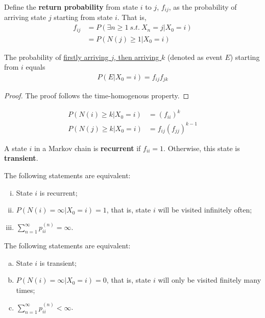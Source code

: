 \documentclass{article}
\begin{document}
    \begin{definition}
    	Define the \textbf{return probability} from state $i$ to $j$, $f_{ij}$, as the probability of arriving state $j$ starting from state $i$. That is,
    	\begin{align}
    		f_{ij} &= P(\exists n \geq 1\ s.t.\ X_n = j | X_0 = i) \\
    		&= P(N(j) \geq 1 | X_0 = i)
    	\end{align}
    \end{definition}
    
    \begin{proposition}
    	The probability of \ul{firstly arriving $j$, then arriving $k$} (denoted as event $E$) starting from $i$ equals
    	\begin{align}
    		P(E|X_0=i) = f_{ij} f_{jk}
    	\end{align}
    \end{proposition}
    
    \begin{proof}
    	The proof follows the time-homogenous property.
    \end{proof}
    
    \begin{corollary}
    	\begin{align}
    		P(N(i) \geq k| X_0 = i) &= (f_{ii})^k \\
    		P(N(j) \geq k| X_0 = i) &= f_{ij}(f_{jj})^{k-1}
    	\end{align}
    \end{corollary}
    
    \begin{definition}
    	A state $i$ in a Markov chain is \textbf{recurrent} if $f_{ii} = 1$. Otherwise, this state is \textbf{transient}.
    \end{definition}
    
    \begin{theorem}
    	The following statements are equivalent:
    	\begin{enumerate}[(i)]
    		\item State $i$ is recurrent;
    		\item $P(N(i) = \infty|X_0=i) = 1$, that is, state $i$ will be visited infinitely often;
    		\item $\sum_{n=1}^\infty p_{ii}^{(n)} = \infty$.
    	\end{enumerate}
    	The following statements are equivalent:
    	\begin{enumerate}[(a)]
    		\item State $i$ is transient;
    		\item $P(N(i) = \infty|X_0=i) = 0$, that is, state $i$ will only be visited finitely many times;
    		\item $\sum_{n=1}^\infty p_{ii}^{(n)} < \infty$.
    	\end{enumerate}
    \end{theorem}
\end{document}
